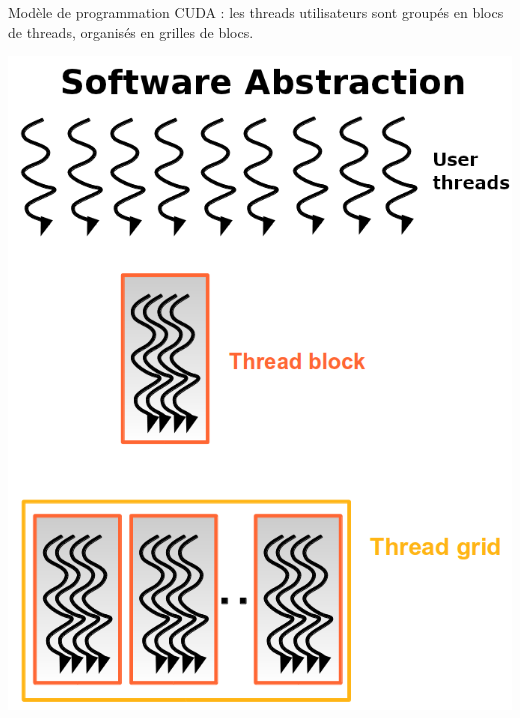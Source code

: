 \documentclass[usenames,dvipsnames]{beamer}
\begin{document}
\begin{frame}
\begin{tabular}{ll}
\end{tabular}
\end{frame}

\begin{frame}
	Modèle de programmation CUDA : les threads utilisateurs sont groupés en blocs de threads, organisés en grilles de blocs.
	
\begin{center}
\includegraphics[scale=0.7]{../../Images/ThreadsGPU}

\end{center}
\end{frame}
\end{document}
